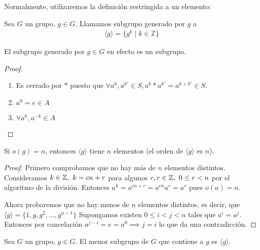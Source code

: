 
Normalmente, utilizaremos la definición restringida a un elemento:

\begin{dfn}
	\label{dfn:subgrupogenerado}
	Sea $G$ un grupo, $g \in G$. Llamamos subgrupo generado por $g$ a
	\begin{align}
		\langle g \rangle = \{g^k \mid k \in \mathbb{Z}\}
	\end{align}
\end{dfn}

\begin{pro}
	El subgrupo generado por $g \in G$ en efecto es un subgrupo.
\end{pro}

\begin{proof}$ $\newline
	\begin{enumerate}
		\item Es cerrado por $\ast$ puesto que $\forall a^k, a^{k'} \in S, a^k \ast a^{k'} = a^{k + k'} \in S$.
		\item $a^0 = e \in A$
		\item $\forall a^{k}, a^{-k} \in A$
	\end{enumerate}
\end{proof}

\begin{pro}
	Si $o(g) = n$, entonces $\langle g \rangle$ tiene $n$ elementos (el orden de $\langle g \rangle$ es $n$).
\end{pro}

\begin{proof}
	Primero comprobamos que no hay más de $n$ elementos distintos. Consideramos $k \in \Z,\ k = cn + r$ para algunos $c, r \in \Z,\ 0 \leq r < n$ por el algoritmo de la división. Entonces $a^k = a^{cn + r} = a^{cn} a^{r} = a^{r}$ pues $o(a) = n$.
	
	Ahora probaremos que no hay menos de $n$ elementos distintos, es decir, que $\langle g \rangle = \{1, g, g^2, \dots, g^{n-1}\}$ Supongamos existen $0 \leq i < j < n$ tales que $a^i = a^j$. Entonces por cancelación $a^{j - i} = e = a^0 \implies j = i$ lo que da una contradicción.
\end{proof}

\begin{thm}
	Sea $G$ un grupo, $g \in G$. El menor subgrupo de $G$ que contiene a $g$ es $\langle g \rangle$.
\end{thm}

